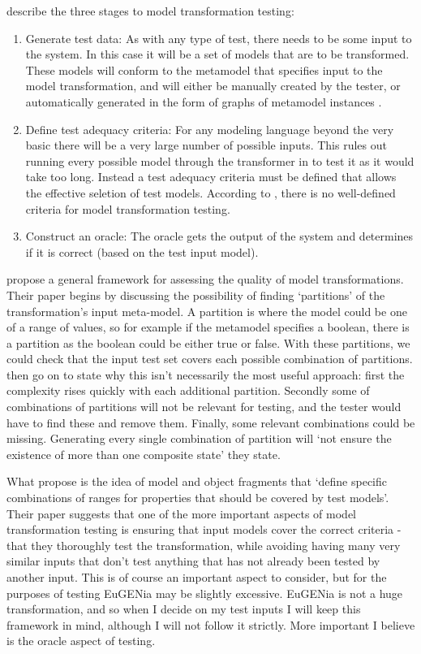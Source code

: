 \citet{mttBarriers} describe the three stages to model transformation testing:

\begin{enumerate}
	\item Generate test data: As with any type of test, there needs to be some input to the system. In this case it will be a set of models that are to be transformed. These models will conform to the metamodel that specifies input to the model transformation, and will either be manually created by the tester, or automatically generated in the form of graphs of metamodel instances \citep{mttBarriers}.
	\item Define test adequacy criteria: For any modeling language beyond the very basic there will be a very large number of possible inputs. This rules out running every possible model through the transformer in to test it as it would take too long. Instead a test adequacy criteria must be defined that allows the effective seletion of test models. According to \citet{mttBarriers}, there is no well-defined criteria for model transformation testing.
	\item Construct an oracle: The oracle gets the output of the system and determines if it is correct (based on the test input model).
\end{enumerate}

\citet{fleureyMTInputs} propose a general framework for assessing the quality of model transformations. Their paper begins by discussing the possibility of finding `partitions' of the transformation's input meta-model. A partition is where the model could be one of a range of values, so for example if the metamodel specifies a boolean, there is a partition as the boolean could be either true or false. With these partitions, we could check that the input test set covers each possible combination of partitions. \citet{fleureyMTInputs} then go on to state why this isn't necessarily the most useful approach: first the complexity rises quickly with each additional partition. Secondly some of combinations of partitions will not be relevant for testing, and the tester would have to find these and remove them. Finally, some relevant combinations could be missing. Generating every single combination of partition will `not ensure the existence of more than one composite state' they state.

What \citet{fleureyMTInputs} propose is the idea of model and object fragments that `define specific combinations of ranges for properties that should be covered by test models'. Their paper suggests that one of the more important aspects of model transformation testing is ensuring that input models cover the correct criteria - that they thoroughly test the transformation, while avoiding having many very similar inputs that don't test anything that has not already been tested by another input. This is of course an important aspect to consider, but for the purposes of testing EuGENia may be slightly excessive. EuGENia is not a huge transformation, and so when I decide on my test inputs I will keep this framework in mind, although I will not follow it strictly. More important I believe is the oracle aspect of testing.

